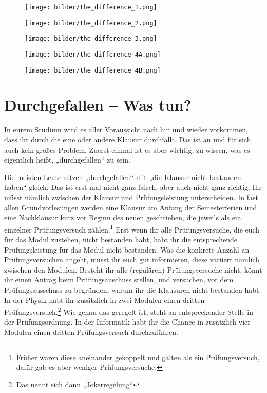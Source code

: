 
\begin{figure*}[t]
    \centering
    \begin{subfigure}[b]{.18\textwidth}
        \texttt{[image: bilder/the\_difference\_1.png]}
    \end{subfigure}
    \begin{subfigure}[b]{.18\textwidth}
        \texttt{[image: bilder/the\_difference\_2.png]}
    \end{subfigure}
    \begin{subfigure}[b]{.18\textwidth}
        \texttt{[image: bilder/the\_difference\_3.png]}
    \end{subfigure}
    \begin{subfigure}[b]{.18\textwidth}
        \texttt{[image: bilder/the\_difference\_4A.png]}
    \end{subfigure}
    \begin{subfigure}[b]{.18\textwidth}
        \texttt{[image: bilder/the\_difference\_4B.png]}
    \end{subfigure}
\end{figure*}

\vspace{-3mm}
\section{Durchgefallen -- Was tun?}

In eurem Studium wird es aller Voraussicht nach hin und wieder vorkommen, dass ihr durch die eine oder andere Klausur durchfallt. Das ist an und für sich auch kein großes Problem. Zuerst einmal ist es aber wichtig, zu wissen, was es eigentlich heißt, „durchgefallen“ zu sein.

Die meisten Leute setzen „durchgefallen“ mit „die Klausur nicht bestanden haben“ gleich. Das ist erst mal nicht ganz falsch, aber auch nicht ganz richtig. Ihr müsst nämlich zwischen der Klausur und Prüfungsleistung unterscheiden. In fast allen Grundvorlesungen werden eine Klausur am Anfang der Semesterferien und eine Nachklausur kurz vor Beginn des neuen geschrieben, die jeweils als ein einzelner Prüfungsversuch zählen.\footnote{Früher waren diese aneinander gekoppelt und galten als ein Prüfungsversuch, dafür gab es aber weniger Prüfungsversuche.}
Erst wenn ihr alle Prüfungsversuche, die euch für das Modul zustehen, nicht bestanden habt, habt ihr die entsprechende Prüfungsleistung für das Modul nicht bestanden. Was die konkrete Anzahl an Prüfungsversuchen angeht, müsst ihr euch gut informieren, diese variiert nämlich zwischen den Modulen. Besteht ihr alle (regulären) Prüfungsversuche nicht, könnt ihr einen Antrag beim Prüfungsauschuss stellen, und versuchen, vor dem Prüfungsausschuss zu begründen, warum ihr die Klausuren nicht bestanden habt. In der Physik habt ihr zusätzlich in zwei Modulen einen dritten Prüfungsversuch.\footnote{Das nennt sich dann „Jokerregelung“} Wie genau das geregelt ist, steht an entsprechender Stelle in der Prüfungsordnung. In der Informatik habt ihr die Chance in zusätzlich vier Modulen einen dritten Prüfungsversuch durchzuführen.

